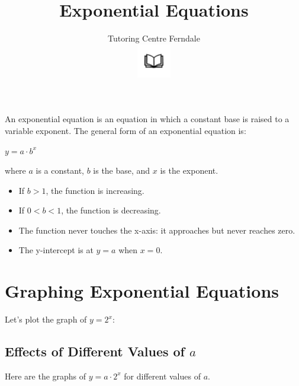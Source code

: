 \documentclass{article}
\title{\textbf{Exponential Equations}}\\
\author{Tutoring Centre Ferndale\\
\includegraphics[width=4em]{ApS_logo.png}}
\date{}
\begin{document}
\maketitle

An exponential equation is an equation in which a constant base is raised to a variable exponent. The general form of an exponential equation is:
\begin{center}
{\Large $y = a \cdot b^x$}
\end{center}

where \(a\) is a constant, \(b\) is the base, and \(x\) is the exponent.

\begin{itemize}
    \item If \(b > 1\), the function is increasing.
    \item If \(0 < b < 1\), the function is decreasing.
    \item The function never touches the x-axis: it approaches but never reaches zero.
    \item The y-intercept is at \(y = a\) when \(x = 0\).
\end{itemize}

\section*{Graphing Exponential Equations}
Let's plot the graph of \(y = 2^x\):

\begin{center}
\end{center}

\subsection*{Effects of Different Values of \(a\)}
Here are the graphs of \(y = a \cdot 2^x\) for different values of \(a\).
\end{document}
